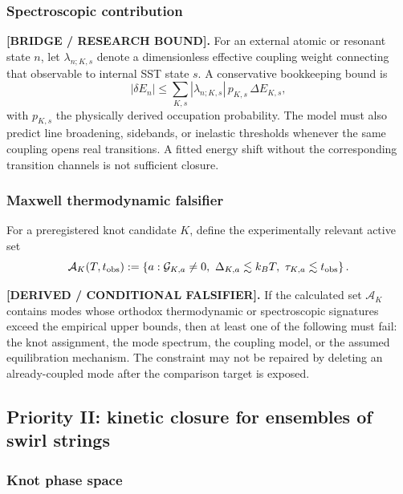 \subsubsection{Spectroscopic contribution}

\textbf{[BRIDGE / RESEARCH BOUND].}
For an external atomic or resonant state $n$, let $\lambda_{n;K,s}$ denote a
dimensionless effective coupling weight connecting that observable to internal
SST state $s$.  A conservative bookkeeping bound is
\begin{equation}
    |\delta E_n|
    \le
    \sum_{K,s}
    |\lambda_{n;K,s}|\,
    p_{K,s}\,
    \Delta E_{K,s},
    \label{eq:rt_maxwell_spectroscopic_bound}
\end{equation}
with $p_{K,s}$ the physically derived occupation probability.  The model must
also predict line broadening, sidebands, or inelastic thresholds whenever the
same coupling opens real transitions.  A fitted energy shift without the
corresponding transition channels is not sufficient closure.

\subsubsection{Maxwell thermodynamic falsifier}

For a preregistered knot candidate $K$, define the experimentally relevant
active set
\begin{equation}
    \mathcal A_K(T,t_{\rm obs})
    :=
    \left\{
        a:
        \mathcal G_{K,a}\neq0,
        \ \Delta_{K,a}\lesssim k_BT,
        \ \tau_{K,a}\lesssim t_{\rm obs}
    \right\}.
    \label{eq:rt_maxwell_active_mode_set}
\end{equation}

\textbf{[DERIVED / CONDITIONAL FALSIFIER].}
If the calculated set $\mathcal A_K$ contains modes whose orthodox
thermodynamic or spectroscopic signatures exceed the empirical upper bounds,
then at least one of the following must fail: the knot assignment, the mode
spectrum, the coupling model, or the assumed equilibration mechanism.  The
constraint may not be repaired by deleting an already-coupled mode after the
comparison target is exposed.

\subsection{Priority II: kinetic closure for ensembles of swirl strings}
    \label{subsec:rt_maxwell_knot_kinetics}

\subsubsection{Knot phase space}

